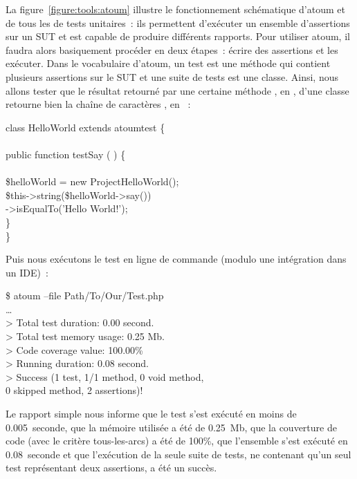 La figure~\ref{figure:tools:atoum} illustre le fonctionnement schématique
d'atoum et de tous les  de tests unitaires~: ils permettent
d'exécuter un ensemble d'assertions sur un SUT et est capable de produire
différents rapports. Pour utiliser atoum, il faudra alors basiquement procéder
en deux étapes~: écrire des assertions et les exécuter. Dans le vocabulaire
d'atoum, un test est une méthode qui contient plusieurs assertions sur le SUT et
une suite de tests est une classe. Ainsi, nous allons tester que le résultat
retourné par une certaine méthode , en , d'une classe
 retourne bien la chaîne de caractères
, en ~:
%
\begin{pre}
class HelloWorld extends \bslash{}atoum\bslash{}test \{ \\
 \\
    public function testSay ( ) \{ \\
 \\
        \$helloWorld = new \bslash{}Project\bslash{}HelloWorld(); \\
        \$this->string(\$helloWorld->say())       \\
                  ->isEqualTo('Hello World!');  \\
    \} \\
\}
\end{pre}
%
Puis nous exécutons le test en ligne de commande (modulo une intégration dans un
IDE)~:
%
\begin{pre}
\$ atoum --file Path/To/Our/Test.php \\
… \\
> Total test duration: 0.00 second. \\
> Total test memory usage: 0.25 Mb. \\
> Code coverage value: 100.00\% \\
> Running duration: 0.08 second. \\
> Success (1 test, 1/1 method, 0 void method, \\
           0 skipped method, 2 assertions)!
\end{pre}
%
Le rapport simple nous informe que le test s'est exécuté en moins de
0.005~seconde, que la mémoire utilisée a été de 0.25~Mb, que la couverture de
code (avec le critère tous-les-arcs) a été de 100\%, que l'ensemble s'est
exécuté en 0.08~seconde et que l'exécution de la seule suite de tests, ne
contenant qu'un seul test représentant deux assertions, a été un succès. \\

